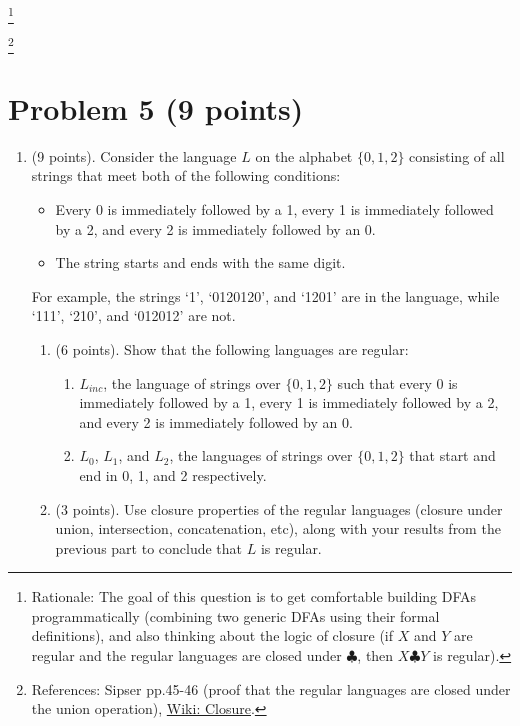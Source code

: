 \documentclass[letterpaper,11pt,twoside]{article}
\theoremstyle{plain}
\theoremstyle{definition}
\theoremstyle{remark}
\theoremstyle{restate}
\newcommand\blfootnote[1]{%
  \begingroup
  \renewcommand\thefootnote{}\footnote{#1}%
  \addtocounter{footnote}{-1}%
  \endgroup
}
\begin{document}
\blfootnote{Rationale: The goal of this question is to get comfortable building DFAs programmatically (combining two generic DFAs using their formal definitions), and also thinking about the logic of closure (if $X$ and $Y$ are regular and the regular languages are closed under $\clubsuit$, then $X \clubsuit Y$ is regular).}
\blfootnote{References: Sipser pp.45-46 (proof that the regular languages are closed under the union operation), \href{https://en.wikipedia.org/wiki/Closure_(mathematics)}{Wiki: Closure}.}

\clearpage
\section{Problem 5 (9 points)}

\begin{enumerate}
    \item (9 points). Consider the language $L$ on the alphabet $\{0, 1, 2\}$ consisting of all strings that meet both of the following conditions:
    \begin{itemize}
        \item Every 0 is immediately followed by a 1, every 1 is immediately followed by a 2, and every 2 is immediately followed by an 0.
        \item The string starts and ends with the same digit.
    \end{itemize}
    For example, the strings `1', `0120120', and `1201' are in the language, while `111', `210', and `012012' are not.
    \begin{enumerate}
        \item (6 points). Show that the following languages are regular:
        \begin{enumerate}
            \item $L_{inc}$, the language of strings over $\{0,1,2\}$ such that every 0 is immediately followed by a 1, every 1 is immediately followed by a 2, and every 2 is immediately followed by an 0.
            
            \item $L_0$, $L_1$, and $L_2$, the languages of strings over $\{0, 1, 2\}$ that start and end in 0, 1, and 2 respectively.
            
        \end{enumerate}
        \item (3 points). Use closure properties of the regular languages (closure under union, intersection, concatenation, etc), along with your results from the previous part to conclude that $L$ is regular.
        
    \end{enumerate}
\end{enumerate}
\end{document}

